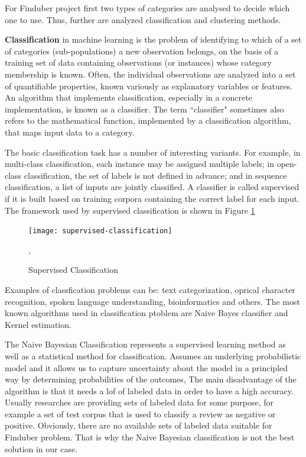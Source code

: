 For Finduber project first two types of categories are analysed to decide which one to use. Thus, further are analyzed classification and clustering methods.

\textbf{Classification} in machine learning is the problem of identifying to which of a set of categories (sub-populations) a new observation belongs, on the basis of a training set of data containing observations (or instances) whose category membership is known. Often, the individual observations are analyzed into a set of quantifiable properties, known variously as explanatory variables or features. An algorithm that implements classification, especially in a concrete implementation, is known as a classifier. The term ``classifier" sometimes also refers to the mathematical function, implemented by a classification algorithm, that maps input data to a category.

The basic classification task has a number of interesting variants. For example, in multi-class classification, each instance may be assigned multiple labels; in open-class classification, the set of labels is not defined in advance; and in sequence classification, a list of inputs are jointly classified. A classifier is called supervised if it is built based on training corpora containing the correct label for each input. The framework used by supervised classification is shown in Figure \ref{classification}

\begin{figure}[!ht]
\centering
\texttt{[image: supervised-classification]}
\caption{Supervised Classification}\label{classification}, \cite{nltk}
\end{figure}

Examples of classfication problems can be: text categorization, oprical character recognition, spoken language understanding, bioinformatics and others. The most known algorithms used in classification ptoblem are Naive Bayes classifier and Kernel estimation.

The Naive Bayesian Classification represents a supervised learning method as well as a statistical method for classification. Assumes an underlying probabilistic model and it allows us to capture uncertainty about the model in a principled way by determining probabilities of the outcomes, \cite{bayesian} The main disadvantage of the algorithm is that it needs a lof of labeled data in order to have a high accuracy. Usually researches are providing sets of labeled data for some purpose, for example a set of test corpus that is used to classify a review as negative or positive. Obviously, there are no available sets of labeled data suitable for Finduber problem. That is why the Naive Bayesian classification is not the best solution in our case. 

